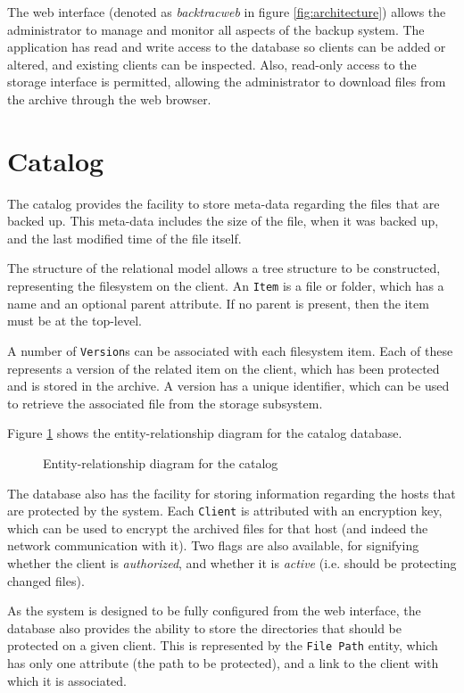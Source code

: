 The web interface (denoted as \emph{backtracweb} in figure
\ref{fig:architecture}) allows the administrator to manage and monitor all
aspects of the backup system. The application has read and write access to the
database so clients can be added or altered, and existing clients can be
inspected. Also, read-only access to the storage interface is permitted,
allowing the administrator to download files from the archive through the web
browser.

\section{Catalog}

The catalog provides the facility to store meta-data regarding the files that
are backed up. This meta-data includes the size of the file, when it was backed
up, and the last modified time of the file itself.

The structure of the relational model allows a tree structure to be
constructed, representing the filesystem on the client. An \verb!Item! is
a file or folder, which has a name and an optional parent attribute. If no
parent is present, then the item must be at the top-level.

A number of \verb!Version!s can be associated with each filesystem item. Each
of these represents a version of the related item on the client, which has been
protected and is stored in the archive. A version has a unique identifier,
which can be used to retrieve the associated file from the storage subsystem.

Figure \ref{fig:erd} shows the entity-relationship diagram for the catalog
database.

\begin{figure}
    \begin{center}
        
    \end{center}
    \caption{Entity-relationship diagram for the catalog}
    \label{fig:erd}
\end{figure}

The database also has the facility for storing information regarding the hosts
that are protected by the system. Each \verb!Client! is attributed with an
encryption key, which can be used to encrypt the archived files for that host
(and indeed the network communication with it). Two flags are also available,
for signifying whether the client is \emph{authorized}, and whether it is
\emph{active} (i.e. should be protecting changed files).

As the system is designed to be fully configured from the web interface, the
database also provides the ability to store the directories that should be
protected on a given client. This is represented by the \verb!File Path!
entity, which has only one attribute (the path to be protected), and a link to
the client with which it is associated.

